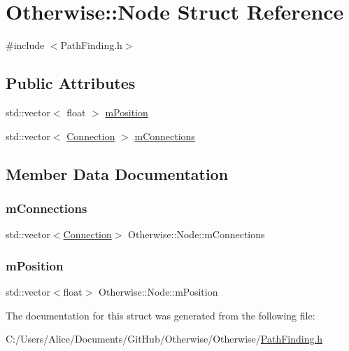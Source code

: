 \hypertarget{struct_otherwise_1_1_node}{}\section{Otherwise\+:\+:Node Struct Reference}
\label{struct_otherwise_1_1_node}


{\ttfamily \#include $<$Path\+Finding.\+h$>$}

\subsection*{Public Attributes}
\begin{DoxyCompactItemize}
\item 
std\+::vector$<$ float $>$ \hyperlink{struct_otherwise_1_1_node_a7a24300fc572bbc53c4b2d35b2d8f10b}{m\+Position}
\item 
std\+::vector$<$ \hyperlink{struct_otherwise_1_1_connection}{Connection} $>$ \hyperlink{struct_otherwise_1_1_node_a0a9fbea3fbe237bab6a774a08e84b4bc}{m\+Connections}
\end{DoxyCompactItemize}


\subsection{Member Data Documentation}
\mbox{\label{struct_otherwise_1_1_node_a0a9fbea3fbe237bab6a774a08e84b4bc}} 
\subsubsection{\texorpdfstring{m\+Connections}{mConnections}}
{\footnotesize\ttfamily std\+::vector$<$\hyperlink{struct_otherwise_1_1_connection}{Connection}$>$ Otherwise\+::\+Node\+::m\+Connections}

\mbox{\label{struct_otherwise_1_1_node_a7a24300fc572bbc53c4b2d35b2d8f10b}} 
\subsubsection{\texorpdfstring{m\+Position}{mPosition}}
{\footnotesize\ttfamily std\+::vector$<$float$>$ Otherwise\+::\+Node\+::m\+Position}



The documentation for this struct was generated from the following file\+:\begin{DoxyCompactItemize}
\item 
C\+:/\+Users/\+Alice/\+Documents/\+Git\+Hub/\+Otherwise/\+Otherwise/\hyperlink{_path_finding_8h}{Path\+Finding.\+h}\end{DoxyCompactItemize}
